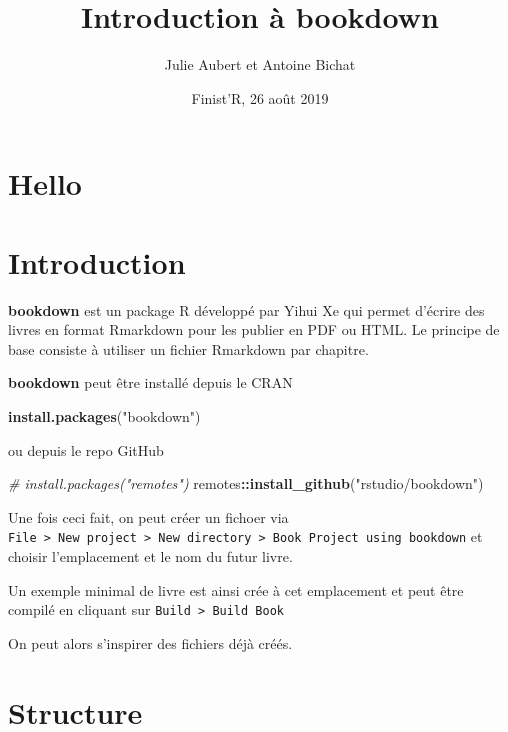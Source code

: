 \documentclass[]{book}
\title{Introduction à bookdown}
\author{Julie Aubert et Antoine Bichat}
\date{Finist'R, 26 août 2019}
\newenvironment{Shaded}{\begin{snugshade}}{\end{snugshade}}
\newcommand{\CommentTok}[1]{\textcolor[rgb]{0.56,0.35,0.01}{\textit{#1}}}
\newcommand{\KeywordTok}[1]{\textcolor[rgb]{0.13,0.29,0.53}{\textbf{#1}}}
\newcommand{\NormalTok}[1]{#1}
\newcommand{\OperatorTok}[1]{\textcolor[rgb]{0.81,0.36,0.00}{\textbf{#1}}}
\newcommand{\StringTok}[1]{\textcolor[rgb]{0.31,0.60,0.02}{#1}}
\theoremstyle{definition}
\theoremstyle{definition}
\theoremstyle{definition}
\theoremstyle{remark}
\begin{document}
\maketitle

{
\setcounter{tocdepth}{1}
\tableofcontents
}
\hypertarget{hello}{%
\chapter*{Hello}\label{hello}}

\hypertarget{intro}{%
\chapter{Introduction}\label{intro}}

\textbf{bookdown} \citep{R-bookdown} est un package R développé par Yihui Xe qui permet d'écrire des livres en format Rmarkdown \citep{R-rmarkdown} pour les publier en PDF ou HTML. Le principe de base consiste à utiliser un fichier Rmarkdown par chapitre.

\textbf{bookdown} peut être installé depuis le CRAN

\begin{Shaded}
\begin{Highlighting}[]
\KeywordTok{install.packages}\NormalTok{(}\StringTok{"bookdown"}\NormalTok{)}
\end{Highlighting}
\end{Shaded}

ou depuis le repo GitHub

\begin{Shaded}
\begin{Highlighting}[]
\CommentTok{# install.packages("remotes")}
\NormalTok{remotes}\OperatorTok{::}\KeywordTok{install_github}\NormalTok{(}\StringTok{"rstudio/bookdown"}\NormalTok{)}
\end{Highlighting}
\end{Shaded}

Une fois ceci fait, on peut créer un fichoer via \texttt{File\ \textgreater{}\ New\ project\ \textgreater{}\ New\ directory\ \textgreater{}\ Book\ Project\ using\ bookdown} et choisir l'emplacement et le nom du futur livre.

Un exemple minimal de livre est ainsi crée à cet emplacement et peut être compilé en cliquant sur \texttt{Build\ \textgreater{}\ Build\ Book}

On peut alors s'inspirer des fichiers déjà créés.

\hypertarget{structure}{%
\chapter{Structure}\label{structure}}
\end{document}
